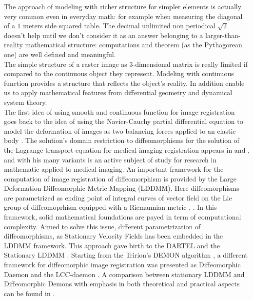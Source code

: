 The approach of modeling with richer structure for simpler elements is actually very common even in everyday math: for example when measuring the diagonal of a $1$ meters side squared table. The decimal unlimited non periodical $\sqrt{2}$ doesn't help until we don't consider it as an answer belonging to a larger-than-reality mathematical structure: computations and theorem (as the Pythagorean one) are well defined and meaningful.\\ 
The simple structure of a raster image as 3-dimensional matrix is really limited if compared to the continuous object they represent. Modeling with continuous function provides a structure that reflects the object's reality. In addition enable us to apply mathematical features from differential geometry and dynamical system theory.\\
The first idea of using smooth and continuous function for image registration goes back to the idea of using the Navier-Cauchy partial differential equation to model the deformation of images as two balancing forces applied to an elastic body \cite{Broit:1981}. The solution's domain restriction to diffeomorphisms for the solution of the Lagrange transport equation for medical imaging registration appears in \cite{Dupuis:98:variationalproblems} and \cite{Trouve:98}, and with his many variants is an active subject of study for research in mathematic applied to medical imaging.
An important framework for the computation of image registration of diffeomorphism is provided by the Large Deformation Diffeomorphic Metric Mapping (LDDMM). Here diffeomorphisms are parametrized as ending point of integral curves of vector field on the Lie group of diffeomoprhism equipped with a Riemannian metric \cite{dupuis1998variational}, \cite{beg2005computing}. In this framework, solid mathematical foundations are payed in term of computational complexity. Aimed to solve this issue, different parametrization of diffeomorphisms, as Stationary Velocity Fields \cite{arsigny2006statistics} has been embedded in the LDDMM framework. This approach gave birth to the DARTEL \cite{Ashburner:07} and the Stationary LDDMM \cite{hernandez2007registration}. Starting from the Tririon's DEMON algorithm \cite{thirion1998image}, a different framework for diffeomorphic image registration was presented as Diffeomorphic Daemon \cite{vercauteren2007non} and the LCC-daemon \cite{lorenzi2013lcc} . A comparison between stationary LDDMM and Diffeomorphic Demons with emphasis in both theoretical and practical aspects can be found in \cite{hernandez2008comparing}. \\
